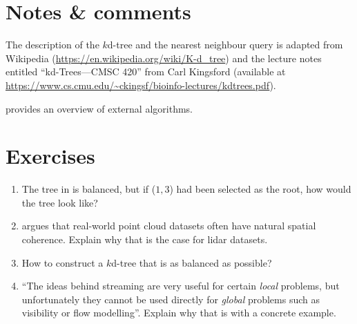 %
\section{Notes \& comments}

The description of the $k$d-tree and the nearest neighbour query is adapted from Wikipedia (\url{https://en.wikipedia.org/wiki/K-d_tree}) and the lecture notes entitled ``kd-Trees---CMSC 420'' from Carl Kingsford (available at \url{https://www.cs.cmu.edu/~ckingsf/bioinfo-lectures/kdtrees.pdf}).

\citet{Vitter01} provides an overview of external algorithms.


%
\section{Exercises}

\begin{enumerate}
  \item The tree in  is balanced, but if ($1,3$) had been selected as the root, how would the tree look like?
  \item \citet{Isenburg06-1} argues that real-world point cloud datasets often have natural spatial coherence. Explain why that is the case for lidar datasets.
  \item How to construct a $k$d-tree that is as balanced as possible?
  \item ``The ideas behind streaming are very useful for certain \emph{local} problems, but unfortunately they cannot be used directly for \emph{global} problems such as visibility or flow modelling''. Explain why that is with a concrete example.
\end{enumerate}
